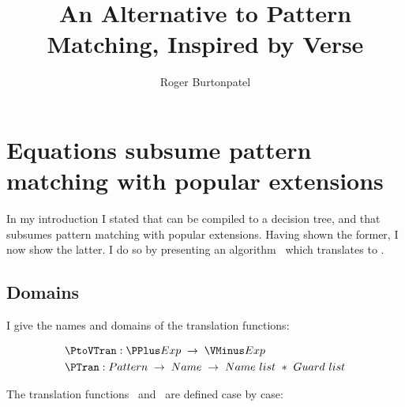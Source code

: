 \documentclass[manuscript,screen,review, 12pt, nonacm]{acmart}
\title{An Alternative to Pattern Matching, Inspired by Verse}
\author{Roger Burtonpatel}
\affiliation{%
\institution{Tufts University}
\streetaddress{419 Boston Ave}
  \city{Medford}
  \state{Massachusetts}
  \country{USA}
  \postcode{02155}
  }
\begin{document}
\section{Equations subsume pattern matching with popular extensions}
\label{pplustovminus}
    In my introduction I stated that \VMinus can be compiled to a decision tree,
    and that \VMinus subsumes pattern matching with popular extensions. Having
    shown the former, I now show the latter. I do so by presenting an algorithm
    \PtoVTran\ which translates \PPlus to \VMinus. 
    

    \subsection{Domains}

    I give the names and domains of the translation functions: 
    
    \begin{align*}
        &\PtoVTran: \PPlus Exp\; \rightarrow\; \VMinus Exp \\
        &\PTran: Pattern\; \rightarrow\; Name\; \rightarrow\; Name\ list\ *\ Guard\ list \\
    \end{align*}
    
    The translation functions \PtoVTran\ and \PTran\ are defined case by case: 
    
    
        
\end{document}
